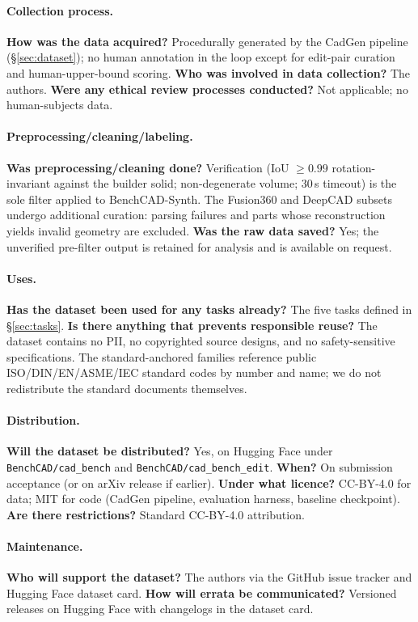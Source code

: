 \documentclass{article}
\begin{document}
\paragraph{Collection process.}
\textbf{How was the data acquired?} Procedurally generated by the CadGen pipeline (\S\ref{sec:dataset}); no human annotation in the loop except for edit-pair curation and human-upper-bound scoring. \textbf{Who was involved in data collection?} The authors. \textbf{Were any ethical review processes conducted?} Not applicable; no human-subjects data.

\paragraph{Preprocessing/cleaning/labeling.}
\textbf{Was preprocessing/cleaning done?} Verification (IoU $\geq 0.99$ rotation-invariant against the builder solid; non-degenerate volume; 30\,s timeout) is the sole filter applied to BenchCAD-Synth. The Fusion360 and DeepCAD subsets undergo additional curation: parsing failures and parts whose reconstruction yields invalid geometry are excluded. \textbf{Was the raw data saved?} Yes; the unverified pre-filter output is retained for analysis and is available on request.

\paragraph{Uses.}
\textbf{Has the dataset been used for any tasks already?} The five tasks defined in \S\ref{sec:tasks}. \textbf{Is there anything that prevents responsible reuse?} The dataset contains no PII, no copyrighted source designs, and no safety-sensitive specifications. The standard-anchored families reference public ISO/DIN/EN/ASME/IEC standard codes by number and name; we do not redistribute the standard documents themselves.

\paragraph{Distribution.}
\textbf{Will the dataset be distributed?} Yes, on Hugging Face under \texttt{BenchCAD/cad\_bench} and \texttt{BenchCAD/cad\_bench\_edit}. \textbf{When?} On submission acceptance (or on arXiv release if earlier). \textbf{Under what licence?} CC-BY-4.0 for data; MIT for code (CadGen pipeline, evaluation harness, baseline checkpoint). \textbf{Are there restrictions?} Standard CC-BY-4.0 attribution.

\paragraph{Maintenance.}
\textbf{Who will support the dataset?} The authors via the GitHub issue tracker and Hugging Face dataset card. \textbf{How will errata be communicated?} Versioned releases on Hugging Face with changelogs in the dataset card.
\end{document}
